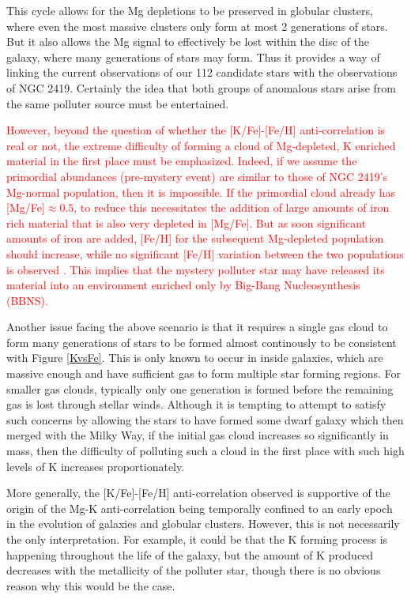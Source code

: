 \documentclass[a4paper,fleqn,usenatbib]{mnras}
\newcommand{\todo}[1]{\textcolor{red}{#1}}
\begin{document}
This cycle allows for the Mg depletions to be preserved in globular clusters, where even the most massive clusters only form at most 2 generations of stars. But it also allows the Mg signal to effectively be lost within the disc of the galaxy, where many generations of stars may form. Thus it provides a way of linking the current observations of our 112 candidate stars with the observations of NGC 2419. Certainly the idea that both groups of anomalous stars arise from the same polluter source must be entertained.

\todo{However, beyond the question of whether the [K/Fe]-[Fe/H] anti-correlation is real or not, the extreme difficulty of forming a cloud of Mg-depleted, K enriched material in the first place must be emphasized. Indeed, if we assume the primordial abundances (pre-mystery event) are similar to those of NGC 2419's Mg-normal population, then it is impossible. If the primordial cloud already has [Mg/Fe]$\approx 0.5$, to reduce this necessitates the addition of large amounts of iron rich material that is also very depleted in [Mg/Fe]. But as soon significant amounts of iron are added, [Fe/H] for the subsequent Mg-depleted population should increase, while no significant [Fe/H] variation between the two populations is observed \citep{cohenkirby2012, mucciarelli2012}. This implies that the mystery polluter star may have released its material into an environment enriched only by Big-Bang Nucleosynthesis (BBNS).}

Another issue facing the above scenario is that it requires a single gas cloud to form many generations of stars to be formed almost continously to be consistent with Figure \ref{KvsFe}. This is only known to occur in inside galaxies, which are massive enough and have sufficient gas to form multiple star forming regions. For smaller gas clouds, typically only one generation is formed before the remaining gas is lost through stellar winds. Although it is tempting to attempt to satisfy such concerns by allowing the stars to have formed some dwarf galaxy which then merged with the Milky Way, if the initial gas cloud increases so significantly in mass, then the difficulty of polluting such a cloud in the first place with such high levels of K increases proportionately.

More generally, the [K/Fe]-[Fe/H] anti-correlation observed is supportive of the origin of the Mg-K anti-correlation being temporally confined to an early epoch in the evolution of galaxies and globular clusters. However, this is not necessarily the only interpretation. For example, it could be that the K forming process is happening throughout the life of the galaxy, but the amount of K produced decreases with the metallicity of the polluter star, though there is no obvious reason why this would be the case.
\end{document}
